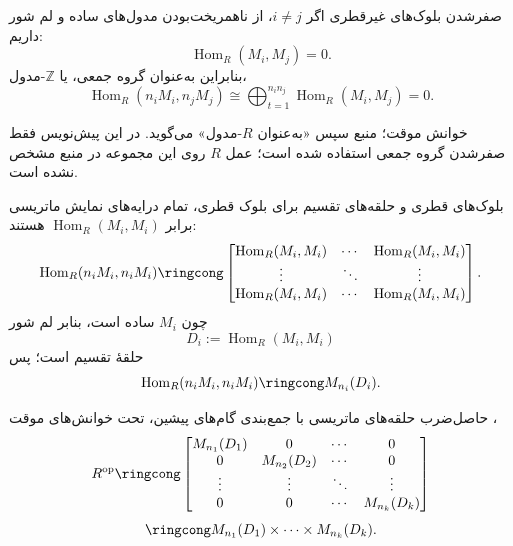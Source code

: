 \begin{frame}[t]{صفرشدن بلوک‌های غیرقطری}
    \label{lec12:off-diagonal-vanishing}
    اگر $i\ne j$، از ناهمریخت‌بودن مدول‌های ساده و لم شور داریم:
    \[
        \operatorname{Hom}_R(M_i,M_j)=0.
    \]
    بنابراین به‌عنوان گروه جمعی، یا $\mathbb Z$-مدول،
    \[
        \operatorname{Hom}_R(n_iM_i,n_jM_j)
        \cong\bigoplus_{t=1}^{n_in_j}\operatorname{Hom}_R(M_i,M_j)=0.
    \]
    \begin{alertblock}{خوانش موقت؛ }
        منبع سپس «به‌عنوان $R$-مدول» می‌گوید. در این پیش‌نویس فقط صفرشدن
        گروه جمعی استفاده شده است؛ عمل $R$ روی این مجموعه در منبع مشخص نشده است.
    \end{alertblock}
\end{frame}

\begin{frame}[t]{بلوک‌های قطری و حلقه‌های تقسیم}
    \label{lec12:diagonal-division-rings}
    برای بلوک قطری، تمام درایه‌های نمایش ماتریسی برابر
    $\operatorname{Hom}_R(M_i,M_i)$ هستند:
    \[
        \operatorname{Hom}_R(n_iM_i,n_iM_i)\ringcong
        \begin{bmatrix}
        \operatorname{Hom}_R(M_i,M_i)&\cdots&\operatorname{Hom}_R(M_i,M_i)\\
        \vdots&\ddots&\vdots\\
        \operatorname{Hom}_R(M_i,M_i)&\cdots&\operatorname{Hom}_R(M_i,M_i)
        \end{bmatrix}.
    \]
    چون $M_i$ ساده است، بنابر لم شور
    \[
        D_i:=\operatorname{Hom}_R(M_i,M_i)
    \]
    حلقهٔ تقسیم است؛ پس
    \[
        \operatorname{Hom}_R(n_iM_i,n_iM_i)\ringcong M_{n_i}(D_i).
    \]
\end{frame}

\begin{frame}[t]{حاصل‌ضرب حلقه‌های ماتریسی}
    \label{lec12:block-product}
    با جمع‌بندی گام‌های پیشین، تحت خوانش‌های موقت ،
    \[
        R^{\mathrm{op}}\ringcong
        \begin{bmatrix}
        M_{n_1}(D_1)&0&\cdots&0\\
        0&M_{n_2}(D_2)&\cdots&0\\
        \vdots&\vdots&\ddots&\vdots\\
        0&0&\cdots&M_{n_k}(D_k)
        \end{bmatrix}
    \]
    \[
        \ringcong M_{n_1}(D_1)\times\cdots\times M_{n_k}(D_k).
    \]
\end{frame}

